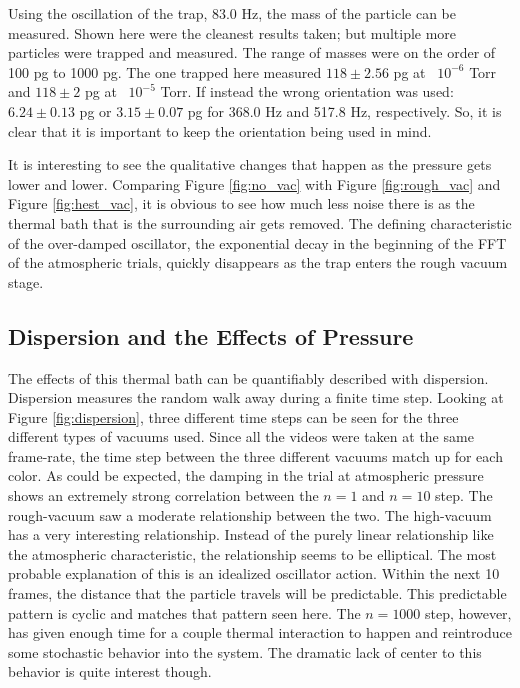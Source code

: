\documentclass[12pt]{article}
\begin{document}
Using the oscillation of the trap, 83.0 Hz, the mass of the particle can be measured. Shown here were the cleanest results taken; but multiple more particles were trapped and measured. The range of masses were on the order of 100 pg to 1000 pg. The one trapped here measured $118 \pm 2.56$ pg at ~$10^{-6}$ Torr and $118 \pm 2$ pg at ~$10^{-5}$ Torr. If instead the wrong orientation was used: $6.24 \pm 0.13$ pg or $3.15 \pm 0.07$ pg for 368.0 Hz and 517.8 Hz, respectively. So, it is clear that it is important to keep the orientation being used in mind. 

It is interesting to see the qualitative changes that happen as the pressure gets lower and lower. Comparing Figure \ref{fig:no_vac} with Figure \ref{fig:rough_vac} and Figure \ref{fig:hest_vac}, it is obvious to see how much less noise there is as the thermal bath that is the surrounding air gets removed. The defining characteristic of the over-damped oscillator, the exponential decay in the beginning of the FFT of the atmospheric trials, quickly disappears as the trap enters the rough vacuum stage. 


\subsection{Dispersion and the Effects of Pressure}

The effects of this thermal bath can be quantifiably described with dispersion. Dispersion measures the random walk away during a finite time step. Looking at Figure \ref{fig:dispersion}, three different time steps can be seen for the three different types of vacuums used. Since all the videos were taken at the same frame-rate, the time step between the three different vacuums match up for each color. As could be expected, the damping in the trial at atmospheric pressure shows an extremely strong correlation between the $n=1$ and $n=10$ step. The rough-vacuum saw a moderate relationship between the two. The high-vacuum has a very interesting relationship. Instead of the purely linear relationship like the atmospheric characteristic, the relationship seems to be elliptical. The most probable explanation of this is an idealized oscillator action. Within the next 10 frames, the distance that the particle travels will be predictable. This predictable pattern is cyclic and matches that pattern seen here. The $n=1000$ step, however, has given enough time for a couple thermal interaction to happen and reintroduce some stochastic behavior into the system. The dramatic lack of center to this behavior is quite interest though. 
\end{document}
